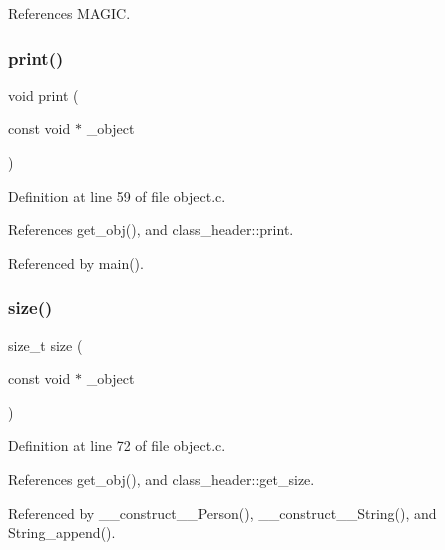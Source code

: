 References M\+A\+G\+IC.

\mbox{\label{group__common_ga34dc6ab72cfd51381e8173226484e827}} 
\subsubsection{\texorpdfstring{print()}{print()}}
{\footnotesize\ttfamily void print (\begin{DoxyParamCaption}\item[{const void $\ast$}]{\+\_\+object }\end{DoxyParamCaption})}



Definition at line 59 of file object.\+c.



References get\+\_\+obj(), and class\+\_\+header\+::print.



Referenced by main().

\mbox{\label{group__common_gafac8564ed88a6f8585f043fc6b2fa7e1}} 
\subsubsection{\texorpdfstring{size()}{size()}}
{\footnotesize\ttfamily size\+\_\+t size (\begin{DoxyParamCaption}\item[{const void $\ast$}]{\+\_\+object }\end{DoxyParamCaption})}



Definition at line 72 of file object.\+c.



References get\+\_\+obj(), and class\+\_\+header\+::get\+\_\+size.



Referenced by \+\_\+\+\_\+construct\+\_\+\+\_\+\+Person(), \+\_\+\+\_\+construct\+\_\+\+\_\+\+String(), and String\+\_\+append().

\mbox{\label{group__common_ga68940c707bbebe6946aeca72df1ee803}} 
